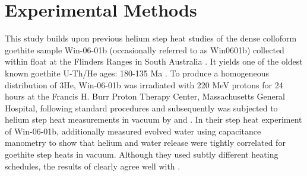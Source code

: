 \section{Experimental Methods}\label{ch2-experimental-methods}

This study builds upon previous helium step heat studies of the dense
colloform goethite sample Win-06-01b (occasionally referred to as
Win0601b) collected within float at the Flinders Ranges in South
Australia \citep{waltenberg2012,monteiro2017}. It yields one of the
oldest known goethite U-Th/He ages: 180-135 Ma \citep{waltenberg2012}. To
produce a homogeneous distribution of 3He, Win-06-01b was irradiated
with 220 MeV protons for 24 hours at the Francis H. Burr Proton Therapy
Center, Massachusetts General Hospital, following standard procedures
\citep{shuster2005} and subsequently was subjected to helium step
heat measurements in vacuum by \citet{monteiro2017} and \citet{farley2024}.
In their step heat experiment of Win-06-01b, \citet{farley2024}
additionally measured evolved water using capacitance manometry to show
that helium and water release were tightly correlated for goethite step
heats in vacuum. Although they used subtly different heating schedules,
the results of \citet{farley2024} clearly agree well with \citet{monteiro2017}.

